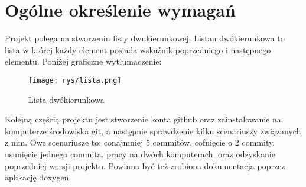 	\newpage
\section{Ogólne określenie wymagań}		%



\hspace{0.60cm}Projekt polega na stworzeniu listy dwukierunkowej. Listan dwókierunkowa to lista w której każdy element posiada wskaźnik poprzedniego i następnego elementu. Poniżej graficzne wytłumaczenie:
 \begin{figure}[!htb]
 	\begin{center}
 		\texttt{[image: rys/lista.png]}
 		\caption{Lista dwókierunkowa}
 		\label{rys:rysunek001}
 	\end{center}
 \end{figure}
\hspace{0.60cm}Kolejną częścią projektu jest stworzenie konta github oraz zainstalowanie na komputerze środowiska git, a następnie sprawdzenie kilku scenariuszy związanych z nim. Owe scenariusze to: conajmniej 5 commitów, cofnięcie o 2 commity, usunięcie jednego commita, pracy na dwóch komputerach, oraz odzyskanie poprzedniej wersji projektu. Powinna być też zrobiona dokumentacja poprzez aplikację doxygen.